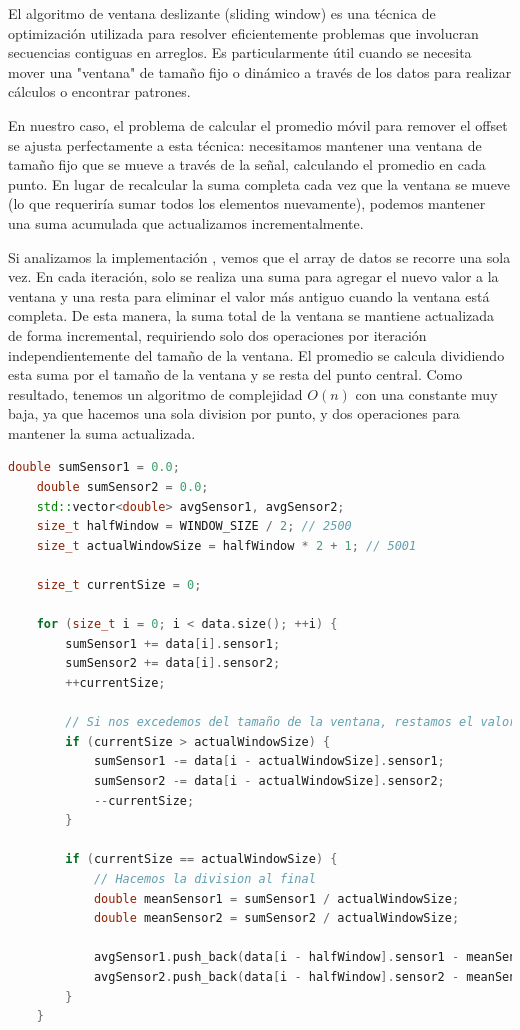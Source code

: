 \documentclass[12pt,a4paper]{article}
\begin{document}
El algoritmo de ventana deslizante (sliding window) es una técnica de optimización utilizada para resolver eficientemente problemas que involucran secuencias contiguas en arreglos. Es particularmente útil cuando se necesita mover una "ventana" de tamaño fijo o dinámico a través de los datos para realizar cálculos o encontrar patrones.

En nuestro caso, el problema de calcular el promedio móvil para remover el offset se ajusta perfectamente a esta técnica: necesitamos mantener una ventana de tamaño fijo que se mueve a través de la señal, calculando el promedio en cada punto. En lugar de recalcular la suma completa cada vez que la ventana se mueve (lo que requeriría sumar todos los elementos nuevamente), podemos mantener una suma acumulada que actualizamos incrementalmente.

Si analizamos la implementación , vemos que el array de datos se recorre una sola vez. En cada iteración, solo se realiza una suma para agregar el nuevo valor a la ventana y una resta para eliminar el valor más antiguo cuando la ventana está completa. De esta manera, la suma total de la ventana se mantiene actualizada de forma incremental, requiriendo solo dos operaciones por iteración independientemente del tamaño de la ventana. El promedio se calcula dividiendo esta suma por el tamaño de la ventana y se resta del punto central. Como resultado, tenemos un algoritmo de complejidad $O(n)$ con una constante muy baja, ya que hacemos una sola division por punto, y dos operaciones para mantener la suma actualizada.

\begin{lstlisting}[language=C++, label=lst:codigo_promedio_movil, caption={normalizer.cpp - Algoritmo optimizado de ventana deslizante con complejidad O(n)}]
    double sumSensor1 = 0.0;
    double sumSensor2 = 0.0;
    std::vector<double> avgSensor1, avgSensor2;
    size_t halfWindow = WINDOW_SIZE / 2; // 2500
    size_t actualWindowSize = halfWindow * 2 + 1; // 5001

    size_t currentSize = 0;

    for (size_t i = 0; i < data.size(); ++i) {
        sumSensor1 += data[i].sensor1;
        sumSensor2 += data[i].sensor2;
        ++currentSize;

        // Si nos excedemos del tamaño de la ventana, restamos el valor mas viejo
        if (currentSize > actualWindowSize) {
            sumSensor1 -= data[i - actualWindowSize].sensor1;
            sumSensor2 -= data[i - actualWindowSize].sensor2;
            --currentSize;
        }

        if (currentSize == actualWindowSize) {
            // Hacemos la division al final
            double meanSensor1 = sumSensor1 / actualWindowSize;
            double meanSensor2 = sumSensor2 / actualWindowSize;

            avgSensor1.push_back(data[i - halfWindow].sensor1 - meanSensor1);
            avgSensor2.push_back(data[i - halfWindow].sensor2 - meanSensor2);
        }
    }
\end{lstlisting}
\end{document}
